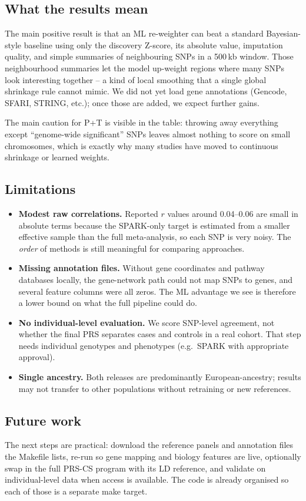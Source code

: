 \subsection{What the results mean}

The main positive result is that an ML re-weighter can beat a standard
Bayesian-style baseline using only the discovery Z-score, its absolute
value, imputation quality, and simple summaries of neighbouring SNPs
in a 500\,kb window. Those neighbourhood summaries let the model
up-weight regions where many SNPs look interesting together -- a kind
of local smoothing that a single global shrinkage rule cannot mimic.
We did not yet load gene annotations (Gencode, SFARI, STRING, etc.); once
those are added, we expect further gains.

The main caution for P+T is visible in the table: throwing away
everything except ``genome-wide significant'' SNPs leaves almost
nothing to score on small chromosomes, which is exactly why many
studies have moved to continuous shrinkage or learned weights.

\subsection{Limitations}

\begin{itemize}[leftmargin=1.4em]
  \item \textbf{Modest raw correlations.} Reported $r$ values around
        0.04--0.06 are small in absolute terms because the SPARK-only
        target is estimated from a smaller effective sample than the
        full meta-analysis, so each SNP is very noisy. The \emph{order}
        of methods is still meaningful for comparing approaches.
  \item \textbf{Missing annotation files.} Without gene coordinates
        and pathway databases locally, the gene-network path could not
        map SNPs to genes, and several feature columns were all zeros.
        The ML advantage we see is therefore a lower bound on what the
        full pipeline could do.
  \item \textbf{No individual-level evaluation.} We score SNP-level
        agreement, not whether the final PRS separates cases and controls
        in a real cohort. That step needs individual genotypes and
        phenotypes (e.g.\ SPARK with appropriate approval).
  \item \textbf{Single ancestry.} Both releases are predominantly
        European-ancestry; results may not transfer to other
        populations without retraining or new references.
\end{itemize}

\subsection{Future work}

The next steps are practical: download the reference panels and
annotation files the Makefile lists, re-run so gene mapping and biology
features are live, optionally swap in the full PRS-CS program with its
LD reference, and validate on individual-level data when access is
available. The code is already organised so each of those is a separate
make target.
